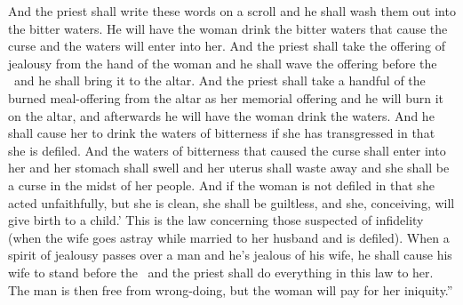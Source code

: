 \begin{inparaenum}
   And the priest shall write these words on a scroll and he shall wash them out into the bitter waters.%
   He will have the woman drink the bitter waters that cause the curse and the waters will enter into her.%
   And the priest shall take the offering of jealousy from the hand of the woman and he shall wave the offering before the \lord\ and he shall bring it to the altar.%
   And the priest shall take a handful of the burned meal-offering from the altar as her memorial offering and he will burn it on the altar, and afterwards he will have the woman drink the waters.%
   And he shall cause her to drink the waters of bitterness if she has transgressed in that she is defiled. And the waters of bitterness that caused the curse shall enter into her and her stomach shall swell and her uterus shall waste away and she shall be a curse in the midst of her people.%
   And if the woman is not defiled in that she acted unfaithfully, but she is clean, she shall be guiltless, and she, conceiving, will give birth to a child.'%
   This is the law concerning those suspected of infidelity (when the wife goes astray while married to her husband and is defiled).%
   When a spirit of jealousy passes over a man and he's jealous of his wife, he shall cause his wife to stand before the \lord\ and the priest shall do everything in this law to her.%
   The man is then free from wrong-doing, but the woman will pay for her iniquity.''%
\end{inparaenum}
